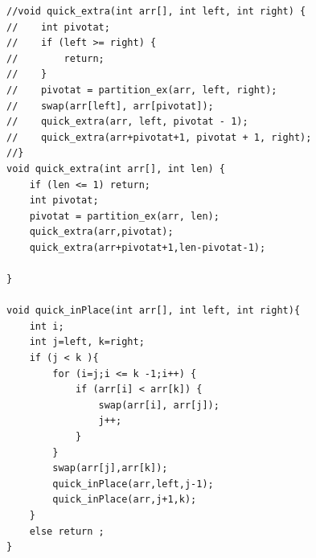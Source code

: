 \documentclass{article}
\begin{document}
\begin{lstlisting}
//void quick_extra(int arr[], int left, int right) {
//    int pivotat;
//    if (left >= right) {
//        return;
//    }
//    pivotat = partition_ex(arr, left, right);
//    swap(arr[left], arr[pivotat]);
//    quick_extra(arr, left, pivotat - 1);
//    quick_extra(arr+pivotat+1, pivotat + 1, right);
//}
void quick_extra(int arr[], int len) {
    if (len <= 1) return;
    int pivotat;
    pivotat = partition_ex(arr, len);
    quick_extra(arr,pivotat);
    quick_extra(arr+pivotat+1,len-pivotat-1);

}

void quick_inPlace(int arr[], int left, int right){
    int i;
    int j=left, k=right;
    if (j < k ){
        for (i=j;i <= k -1;i++) {
            if (arr[i] < arr[k]) {
                swap(arr[i], arr[j]);
                j++;
            }
        }
        swap(arr[j],arr[k]);
        quick_inPlace(arr,left,j-1);
        quick_inPlace(arr,j+1,k);
    }
    else return ;
}
\end{lstlisting}
\end{document}
